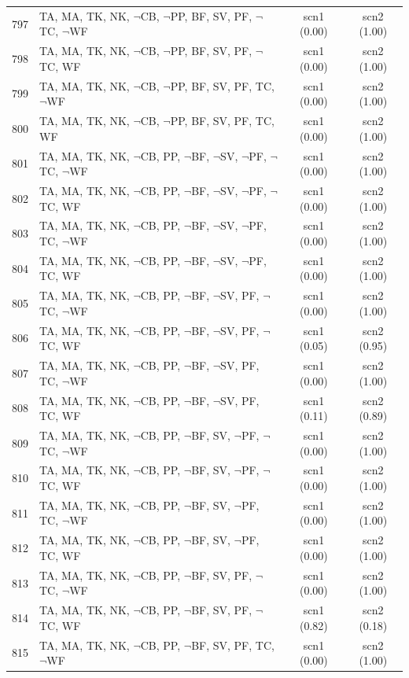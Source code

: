\documentclass[12pt]{article}
\begin{document}
\begin{longtable}{|l|l|c|c|}
797 & TA, MA, TK, NK, $\neg$CB, $\neg$PP, BF, SV, PF, $\neg$TC, $\neg$WF & scn1 (0.00) & scn2 (1.00)\\
798 & TA, MA, TK, NK, $\neg$CB, $\neg$PP, BF, SV, PF, $\neg$TC, WF & scn1 (0.00) & scn2 (1.00)\\
799 & TA, MA, TK, NK, $\neg$CB, $\neg$PP, BF, SV, PF, TC, $\neg$WF & scn1 (0.00) & scn2 (1.00)\\
800 & TA, MA, TK, NK, $\neg$CB, $\neg$PP, BF, SV, PF, TC, WF & scn1 (0.00) & scn2 (1.00)\\
801 & TA, MA, TK, NK, $\neg$CB, PP, $\neg$BF, $\neg$SV, $\neg$PF, $\neg$TC, $\neg$WF & scn1 (0.00) & scn2 (1.00)\\
802 & TA, MA, TK, NK, $\neg$CB, PP, $\neg$BF, $\neg$SV, $\neg$PF, $\neg$TC, WF & scn1 (0.00) & scn2 (1.00)\\
803 & TA, MA, TK, NK, $\neg$CB, PP, $\neg$BF, $\neg$SV, $\neg$PF, TC, $\neg$WF & scn1 (0.00) & scn2 (1.00)\\
804 & TA, MA, TK, NK, $\neg$CB, PP, $\neg$BF, $\neg$SV, $\neg$PF, TC, WF & scn1 (0.00) & scn2 (1.00)\\
805 & TA, MA, TK, NK, $\neg$CB, PP, $\neg$BF, $\neg$SV, PF, $\neg$TC, $\neg$WF & scn1 (0.00) & scn2 (1.00)\\
806 & TA, MA, TK, NK, $\neg$CB, PP, $\neg$BF, $\neg$SV, PF, $\neg$TC, WF & scn1 (0.05) & scn2 (0.95)\\
807 & TA, MA, TK, NK, $\neg$CB, PP, $\neg$BF, $\neg$SV, PF, TC, $\neg$WF & scn1 (0.00) & scn2 (1.00)\\
808 & TA, MA, TK, NK, $\neg$CB, PP, $\neg$BF, $\neg$SV, PF, TC, WF & scn1 (0.11) & scn2 (0.89)\\
809 & TA, MA, TK, NK, $\neg$CB, PP, $\neg$BF, SV, $\neg$PF, $\neg$TC, $\neg$WF & scn1 (0.00) & scn2 (1.00)\\
810 & TA, MA, TK, NK, $\neg$CB, PP, $\neg$BF, SV, $\neg$PF, $\neg$TC, WF & scn1 (0.00) & scn2 (1.00)\\
811 & TA, MA, TK, NK, $\neg$CB, PP, $\neg$BF, SV, $\neg$PF, TC, $\neg$WF & scn1 (0.00) & scn2 (1.00)\\
812 & TA, MA, TK, NK, $\neg$CB, PP, $\neg$BF, SV, $\neg$PF, TC, WF & scn1 (0.00) & scn2 (1.00)\\
813 & TA, MA, TK, NK, $\neg$CB, PP, $\neg$BF, SV, PF, $\neg$TC, $\neg$WF & scn1 (0.00) & scn2 (1.00)\\
814 & TA, MA, TK, NK, $\neg$CB, PP, $\neg$BF, SV, PF, $\neg$TC, WF & scn1 (0.82) & scn2 (0.18)\\
815 & TA, MA, TK, NK, $\neg$CB, PP, $\neg$BF, SV, PF, TC, $\neg$WF & scn1 (0.00) & scn2 (1.00)\\

\end{longtable}
\end{document}
